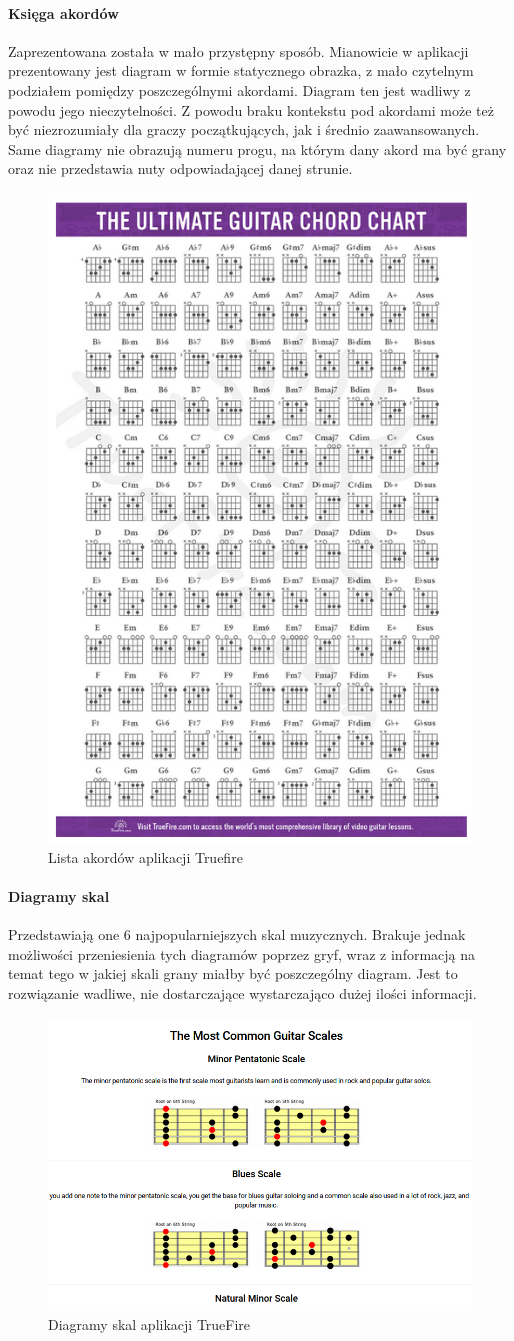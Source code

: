 \paragraph{Księga akordów}

Zaprezentowana została w mało przystępny sposób. Mianowicie w aplikacji prezentowany jest diagram w formie statycznego obrazka, z mało czytelnym podziałem pomiędzy poszczególnymi akordami. Diagram ten jest wadliwy z powodu jego nieczytelności. Z powodu braku kontekstu pod akordami może też być niezrozumiały dla graczy początkujących, jak i średnio zaawansowanych. Same diagramy nie obrazują numeru progu, na którym dany akord ma być grany oraz nie przedstawia nuty odpowiadającej danej strunie.

\begin{figure}[htb]
	\centering
	\includegraphics[width=.4\linewidth]{rys02/ChordChart}
	\caption{Lista akordów aplikacji Truefire} \label{fig:pageLayout}
\end{figure}

\paragraph{Diagramy skal}
Przedstawiają one 6 najpopularniejszych skal muzycznych. Brakuje jednak możliwości przeniesienia tych diagramów poprzez gryf, wraz z informacją na temat tego w jakiej skali grany miałby być poszczególny diagram. Jest to rozwiązanie wadliwe, nie dostarczające wystarczająco dużej ilości informacji. \\

\begin{figure}[htb]
	\centering
	\includegraphics[width=.6\linewidth]{rys02/SKALETF}
	\caption{Diagramy skal aplikacji TrueFire} \label{fig:pageLayout}
\end{figure}

